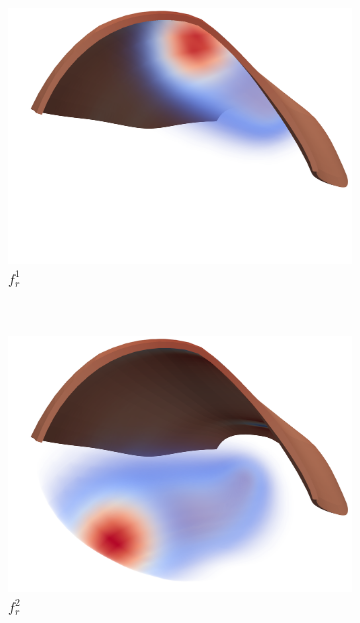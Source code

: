 \begin{figure}
  \centering%
  \begin{subfigure}[t]{0.23\textwidth}%
    \centering%
    \includegraphics[width=\textwidth]{images/results/application/multidomain_fr0_cropped.png}%
    \caption{$f_r^1$}%
    \label{fig:fr0}%
  \end{subfigure}
  \,
  \begin{subfigure}[t]{0.23\textwidth}%
    \centering%
    \includegraphics[width=\textwidth]{images/results/application/multidomain_fr1_cropped.png}%
    \caption{$f_r^2$}%
    \label{fig:fr1}%
  \end{subfigure}
  \,
  \begin{subfigure}[t]{0.23\textwidth}%

\end{subfigure}
\end{figure}
